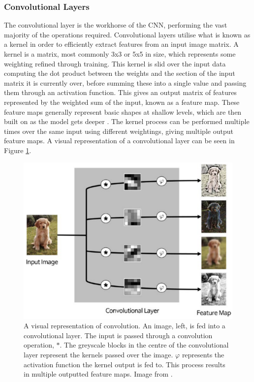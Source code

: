 \subsubsection{Convolutional Layers}\label{ch:Background,sec:CNN,sub:CNN,subsub:convolution}

The convolutional layer is the workhorse of the CNN, performing the vast majority of the operations required. Convolutional layers utilise what is known as a kernel in order to efficiently extract features from an input image matrix. A kernel is a matrix, most commonly 3x3 or 5x5 in size, which represents some weighting refined through training. This kernel is slid over the input data computing the dot product between the weights and the section of the input matrix it is currently over, before summing these into a single value and passing them through an activation function. This gives an output matrix of features represented by the weighted sum of the input, known as a feature map. These feature maps generally represent basic shapes at shallow levels, which are then built on as the model gets deeper \cite{kim_convolutional_2017}. The kernel process can be performed multiple times over the same input using different weightings, giving multiple output feature maps. A visual representation of a convolutional layer can be seen in Figure \ref{fig:convolution}.

\begin{figure}
	\begin{center}
		\includegraphics[scale=0.45]{Chapter2/figs/convolution.png}
	\end{center}
	\caption[A visual representation of convolution.]{A visual representation of convolution. An image, left, is fed into a convolutional layer. The input is passed through a convolution operation, $*$. The greyscale blocks in the centre of the convolutional layer represent the kernels passed over the image. $\varphi$ represents the activation function the kernel output is fed to. This process results in multiple outputted feature maps. Image from \cite{kim_convolutional_2017}.}
	\label{fig:convolution}
\end{figure}

